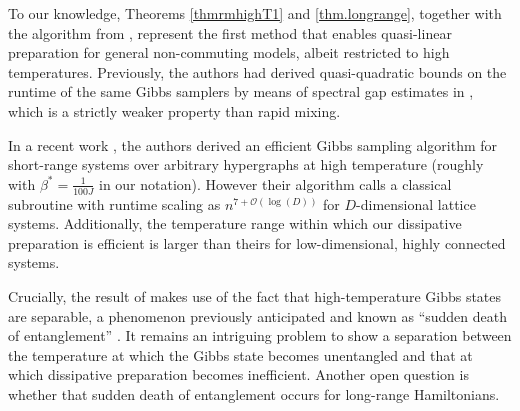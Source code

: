 \documentclass[aps,pra,amsmath,amssymb,twocolumn,10pt]{revtex4-2}
\theoremstyle{definition}
\newcommand{\alv}[1]{\textcolor{blue}{[alv] #1}}
\begin{document}
To our knowledge, Theorems \ref{thmrmhighT1} and \ref{thm.longrange}, together with the algorithm from \cite{chen2023efficient}, represent the first method that enables quasi-linear preparation for general non-commuting models, albeit restricted to high temperatures. Previously, the authors had derived quasi-quadratic bounds on the runtime of the same Gibbs samplers by means of spectral gap estimates
 in \cite{rouze2024efficient}, which is a strictly weaker property than rapid mixing. 

 
In a recent work \cite{tang_efficient}, the authors derived an efficient Gibbs sampling algorithm for short-range systems over arbitrary hypergraphs at high temperature (roughly with $\beta^* =\frac{1}{100J}$ in our notation). However their algorithm calls a classical subroutine with runtime scaling as $n^{7+\mathcal{O}(\log(D))}$ for $D$-dimensional lattice systems. Additionally, the temperature range within which our dissipative preparation is efficient is larger than theirs for low-dimensional, highly connected systems. 
 
 Crucially, the result of \cite{tang_efficient} makes use of the fact that high-temperature Gibbs states are separable, a phenomenon previously anticipated and known as ``sudden death of entanglement'' \cite{Sherman_2016}. It remains an intriguing  problem to show a separation between the temperature at which the Gibbs state becomes unentangled and that at which dissipative preparation becomes inefficient. Another open question is whether that sudden death of entanglement occurs for long-range Hamiltonians. 
 
 



\end{document}
